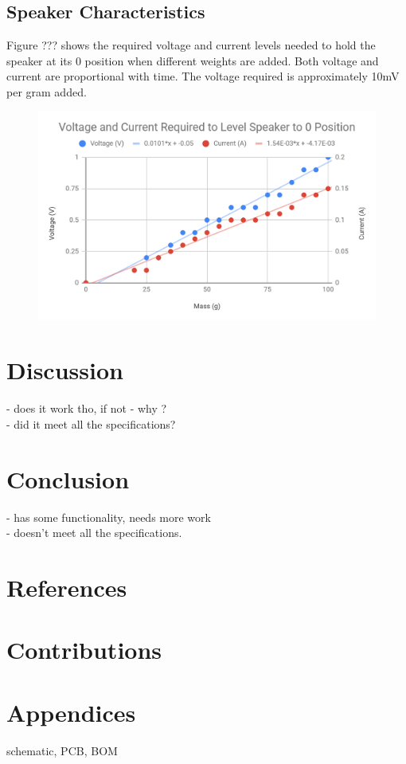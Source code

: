 \documentclass[12pt]{article}
\begin{document}
		\subsection{Speaker Characteristics}
		Figure ??? shows the required voltage and current levels needed to hold the speaker at its 0 position when different weights are added. Both voltage and current are proportional with time. The voltage required is approximately 10mV per gram added.
		\begin{figure}[h!]
			\centering
			\includegraphics[width=\columnwidth]{speaker}
			\caption{}
		\end{figure}
		
		
	\section{Discussion}
	- does it work tho, if not - why ?\\
	- did it meet all the specifications?
	\section{Conclusion}
	- has some functionality, needs more work\\
	- doesn't meet all the specifications.
	
	\section{References}
	\section{Contributions}
	
	\section{Appendices}
	schematic, PCB, BOM
\end{document}
